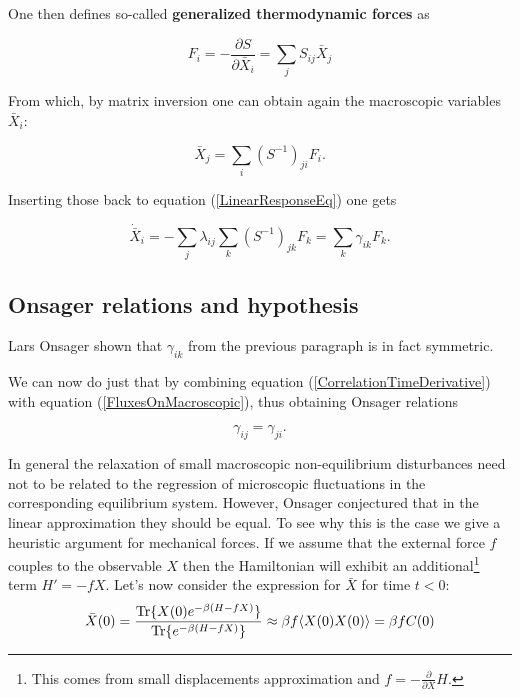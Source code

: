 \documentclass[a4paper,12pt]{article}
\begin{document}
One then defines so-called \textbf{generalized thermodynamic forces} as

\begin{equation}
  F_i= -\frac{\partial{S}}{\partial{\bar{X}_i}}= \sum_j S_{ij}\bar{X}_j
\end{equation}

From which, by matrix inversion one can obtain again the macroscopic variables $\bar{X}_i$:

\begin{equation}
  \bar{X}_j = \sum_i (S^{-1})_{ji} F_i.
\end{equation}


Inserting those back to equation (\ref{LinearResponseEq}) one gets

\begin{equation}
\label{FluxesOnMacroscopic}
  \dot{\bar{X}}_i=-\sum_j \lambda_{ij} \sum_k (S^{-1})_{jk} F_k = \sum_k \gamma_{ik} F_k.
\end{equation}

\subsection{Onsager relations and hypothesis}

Lars Onsager\cite{Onsager:zgWBDrcO} shown that $\gamma_{ik}$ from the previous paragraph is in fact symmetric.

We can now do just that by combining equation (\ref{CorrelationTimeDerivative}) with equation (\ref{FluxesOnMacroscopic}), thus obtaining Onsager relations

\begin{equation}
  \gamma_{ij}=\gamma_{ji}.
\end{equation}

In general the relaxation of small macroscopic non-equilibrium disturbances need not to be related to the regression of microscopic fluctuations in the corresponding equilibrium system. 
However, Onsager conjectured that in the linear approximation they should be equal. To see why this is the case we give a heuristic argument for mechanical forces.
If we assume that the external force $f$ couples to the observable $X$ then the Hamiltonian will exhibit an additional\footnote{This comes from small displacements approximation and $f=-\frac{\partial}{\partial{X}} H$.} term $H'=-f X$.
Let's now consider the expression for $\bar{X}$ for time $t < 0$:
\begin{equation}
  \bar{X}(0)=\frac{\Tr\{ X(0) e^{-\beta (H-f X)} \}}{\Tr\{ e^{-\beta (H-f X)} \}} \approx \beta f \langle X(0)X(0) \rangle= \beta f C(0)
\end{equation}
\end{document}
